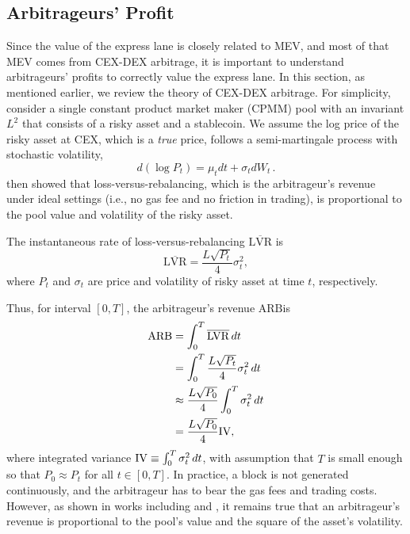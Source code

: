 \subsection{Arbitrageurs' Profit}
Since the value of the express lane is closely related to MEV, and most of that MEV comes from CEX-DEX arbitrage, it is important to understand arbitrageurs' profits to correctly value the express lane. In this section, as mentioned earlier, we review the theory of CEX-DEX arbitrage. For simplicity, consider a single constant product market maker (CPMM) pool with an invariant \(L^2\) that consists of a risky asset and a stablecoin. We assume the log price of the risky asset at CEX, which is a \emph{true} price, follows a semi-martingale process with stochastic volatility, \[
    d\left(\log P_t \right)= \mu_t dt + \sigma_t dW_t \, .
\] \cite{milionis2022automated} then showed that loss-versus-rebalancing, which is the arbitrageur's revenue under ideal settings (i.e., no gas fee and no friction in trading), is proportional to the pool value and volatility of the risky asset.
\begin{prop}
    The instantaneous rate of loss-versus-rebalancing \(\overline{\mathrm{LVR}}\) is \[
    \overline{\mathrm{LVR}} = \frac{L\sqrt{P_t}}{4} \sigma^2_t,
    \] where \(P_t\) and \(\sigma_t\) are price and volatility of risky asset at time \(t\), respectively.
\end{prop}
Thus, for interval \([0,T]\), the arbitrageur's revenue \(\mathrm{ARB}\)is
\begin{align}
    \mathrm{ARB} &= \int^T_0 \overline{\mathrm{LVR}} \, dt \\
        &=  \int^T_0 \frac{L\sqrt{P_t}}{4} \sigma^2_t \, dt \\
        &\approx \frac{L\sqrt{P_0}}{4} \int^T_0 \sigma^2_t \, dt \\
        &= \frac{L\sqrt{P_0}}{4} \mathrm{IV},
\end{align}
where integrated variance \(\mathrm{IV} \equiv \int^T_0 \sigma^2_t \, dt \), with assumption that \(T\) is small enough so that \(P_0 \approx P_t \) for all \(t \in [0,T]\). In practice, a block is not generated continuously, and the arbitrageur has to bear the gas fees and trading costs. However, as shown in works including \cite{milionis2024automated} and \cite{nezlobin2025loss}, it remains true that an arbitrageur's revenue is proportional to the pool's value and the square of the asset's volatility.

